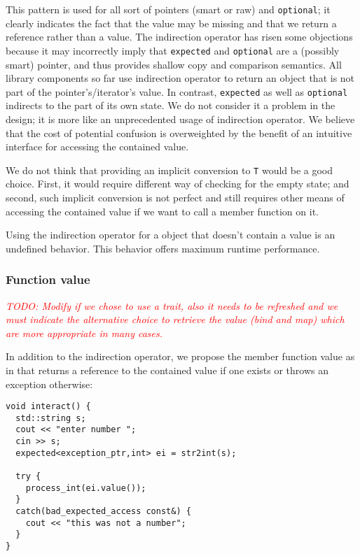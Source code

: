 \documentclass[a4paper,10pt]{article}
\newcommand{\cpp}[1]{\lstinline{#1}}
\newcommand{\todo}[1]{\emph{\textcolor{red}{TODO: #1}}}
\begin{document}
This pattern is used for all sort of pointers (smart or raw) and \cpp{optional}; it clearly indicates the fact that the value may be missing and that we return a reference rather than a value. The indirection operator has risen some objections because it may incorrectly imply that \cpp{expected} and \cpp{optional} are a (possibly smart) pointer, and thus provides shallow copy and comparison semantics. All library components so far use indirection operator to return an object that is not part of the pointer's/iterator's value. In contrast, \cpp{expected} as well as \cpp{optional} indirects to the part of its own state. We do not consider it a problem in the design; it is more like an unprecedented usage of indirection operator. We believe that the cost of potential confusion is overweighted by the benefit of an intuitive interface for accessing the contained value.

We do not think that providing an implicit conversion to \cpp{T} would be a good choice. First, it would require different way of checking for the empty state; and second, such implicit conversion is not perfect and still requires other means of accessing the contained value if we want to call a member function on it.

Using the indirection operator for a object that doesn't contain a value is an undefined behavior. This behavior offers maximum runtime performance.

\subsubsection{Function value}
\todo{Modify if we chose to use a trait, also it needs to be refreshed and we must indicate the alternative choice to retrieve the value (bind and map) which are more appropriate in many cases.}


In addition to the indirection operator, we propose the member function value as in \cite{OptionalRev4} that returns a reference to the contained value if one exists or throws an exception otherwise:

\begin{lstlisting}
void interact() {
  std::string s;
  cout << "enter number ";
  cin >> s;
  expected<exception_ptr,int> ei = str2int(s);
  
  try {
    process_int(ei.value());
  }
  catch(bad_expected_access const&) {
    cout << "this was not a number";
  }
}
\end{lstlisting}
\end{document}
